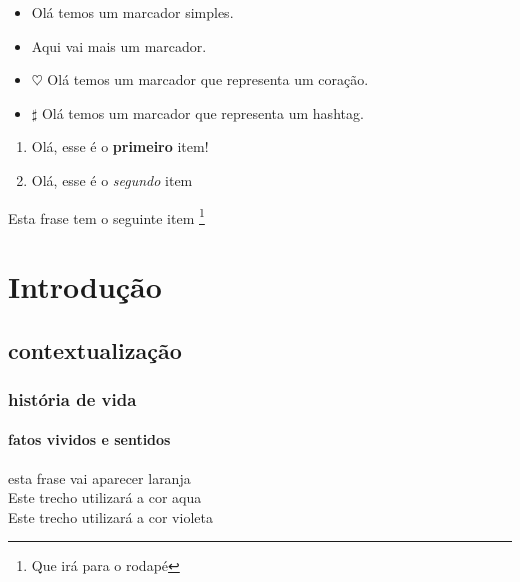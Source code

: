 \documentclass[12pt, a4paper, oneside]{book}
\begin{document}
\begin{footnotesize}%

\begin {itemize} 
\item Olá temos um marcador simples.
\item Aqui vai mais um marcador.
\end {itemize}

\begin {itemize}
\item [$\heartsuit$] Olá temos um marcador que representa um coração.
\item [$\sharp$] Olá temos um marcador que representa um hashtag.
\end {itemize}

\begin {enumerate}
\item Olá, esse é o \textbf{primeiro} item!
\item Olá, esse é o \textit{segundo} item
\end {enumerate}
Esta frase tem o seguinte item \footnote{Que irá para o rodapé}

\end{footnotesize}

\chapter{Introdução}

\section{contextualização}

\subsection{história de vida} 

\subsubsection{fatos vividos e sentidos}

\textcolor {laranja} {esta frase vai aparecer laranja}\\

{\color{Aqua} {Este trecho utilizará a cor aqua}}\\
{\color{Violet} {Este trecho utilizará a cor violeta}}\\
\end{document}
